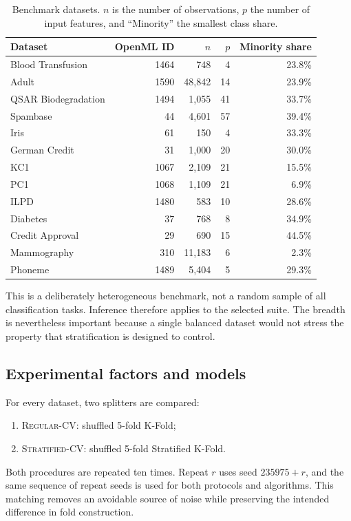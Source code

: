 \documentclass[twoside,11pt]{article}
\newcommand{\regcv}{\textsc{Regular-CV}}
\newcommand{\stratcv}{\textsc{Stratified-CV}}
\begin{document}
\begin{table}[t]
\centering
\caption{Benchmark datasets. $n$ is the number of observations, $p$ the number of input features, and ``Minority'' the smallest class share.}
\label{tab:datasets}
\small
\begin{tabular}{lrrrr}
\toprule
Dataset & OpenML ID & $n$ & $p$ & Minority share \\
\midrule
Blood Transfusion & 1464 & 748 & 4 & 23.8\% \\
Adult & 1590 & 48,842 & 14 & 23.9\% \\
QSAR Biodegradation & 1494 & 1,055 & 41 & 33.7\% \\
Spambase & 44 & 4,601 & 57 & 39.4\% \\
Iris & 61 & 150 & 4 & 33.3\% \\
German Credit & 31 & 1,000 & 20 & 30.0\% \\
KC1 & 1067 & 2,109 & 21 & 15.5\% \\
PC1 & 1068 & 1,109 & 21 & 6.9\% \\
ILPD & 1480 & 583 & 10 & 28.6\% \\
Diabetes & 37 & 768 & 8 & 34.9\% \\
Credit Approval & 29 & 690 & 15 & 44.5\% \\
Mammography & 310 & 11,183 & 6 & 2.3\% \\
Phoneme & 1489 & 5,404 & 5 & 29.3\% \\
\bottomrule
\end{tabular}
\end{table}

This is a deliberately heterogeneous benchmark, not a random sample of all classification tasks. Inference therefore applies to the selected suite. The breadth is nevertheless important because a single balanced dataset would not stress the property that stratification is designed to control.

\subsection{Experimental factors and models}
For every dataset, two splitters are compared:
\begin{enumerate}[leftmargin=*,itemsep=2pt,topsep=3pt]
  \item \regcv: shuffled 5-fold K-Fold;
  \item \stratcv: shuffled 5-fold Stratified K-Fold.
\end{enumerate}
Both procedures are repeated ten times. Repeat $r$ uses seed $235975+r$, and the same sequence of repeat seeds is used for both protocols and algorithms. This matching removes an avoidable source of noise while preserving the intended difference in fold construction.
\end{document}
